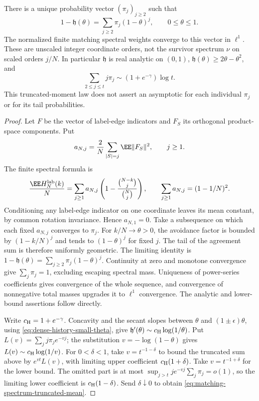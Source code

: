 \documentclass[11pt,letterpaper]{article}
\begin{document}
\begin{corollary}
\label{cor:matching-spectrum}
There is a unique probability vector $(\pi_j)_{j\ge2}$ such that
\begin{equation}\label{eq:matching-spectrum}
 1-\mathfrak h(\theta)=\sum_{j\ge2}\pi_j(1-\theta)^j,
                         \qquad 0\le\theta\le1.
\end{equation}
The normalized finite matching spectral weights converge to this
vector in $\ell^1$. These are unscaled integer coordinate orders,
not the survivor spectrum $\nu$ on scaled orders $j/N$.
In particular $\mathfrak h$ is real analytic on $(0,1)$,
$\mathfrak h(\theta)\ge2\theta-\theta^2$, and
\begin{equation}\label{eq:matching-spectrum-truncated-mean}
 \sum_{2\le j\le t}j\pi_j\sim(1+e^{-\gamma})\log t.
\end{equation}
This truncated-moment law does not assert an asymptotic for each
individual $\pi_j$ or for its tail probabilities.
\end{corollary}
\begin{proof}
Let $F$ be the vector of label-edge indicators and $F_S$ its
orthogonal product-space components. Put
\[
 a_{N,j}=\frac2N\sum_{|S|=j}\EE\|F_S\|^2,\qquad j\ge1.
\]
The finite spectral formula is
\[
 \frac{\EE H_N^{\rm lab}(k)}N
  =\sum_{j\ge1}a_{N,j}
        \left(1-\frac{\binom{N-k}{j}}{\binom Nj}\right),
 \qquad \sum_{j\ge1}a_{N,j}=(1-1/N)^2.
\]
Conditioning any label-edge indicator on one coordinate leaves its
mean constant, by common rotation invariance. Hence $a_{N,1}=0$.
Take a subsequence on which each fixed $a_{N,j}$ converges to $\pi_j$.
For $k/N\to\theta>0$, the avoidance factor is bounded by
$(1-k/N)^j$ and tends to $(1-\theta)^j$ for fixed $j$.
The tail of the agreement sum is therefore uniformly geometric.
The limiting identity is
$1-\mathfrak h(\theta)=\sum_{j\ge2}\pi_j(1-\theta)^j$.
Continuity at zero and monotone convergence give $\sum_j\pi_j=1$,
excluding escaping spectral mass. Uniqueness of power-series
coefficients gives convergence of the whole sequence, and convergence
of nonnegative total masses upgrades it to $\ell^1$ convergence.
The analytic and lower-bound assertions follow directly.

Write $c_{\rm H}=1+e^{-\gamma}$. Concavity and the secant slopes
between $\theta$ and $(1\pm\epsilon)\theta$, using
\eqref{eq:dense-history-small-theta}, give
$\mathfrak h'(\theta)\sim c_{\rm H}\log(1/\theta)$.
Put $L(v)=\sum_j j\pi_je^{-vj}$; the substitution
$v=-\log(1-\theta)$ gives $L(v)\sim c_{\rm H}\log(1/v)$.
For $0<\delta<1$, take $v=t^{-1-\delta}$ to bound the truncated
sum above by $e^{vt}L(v)$, with limiting upper coefficient
$c_{\rm H}(1+\delta)$.
Take $v=t^{-1+\delta}$ for the lower bound. The omitted part is
at most $\sup_{j>t}j e^{-vj}\sum_j\pi_j=o(1)$, so the limiting
lower coefficient is $c_{\rm H}(1-\delta)$.
Send $\delta\downarrow0$ to obtain
\eqref{eq:matching-spectrum-truncated-mean}.
\end{proof}
\end{document}
